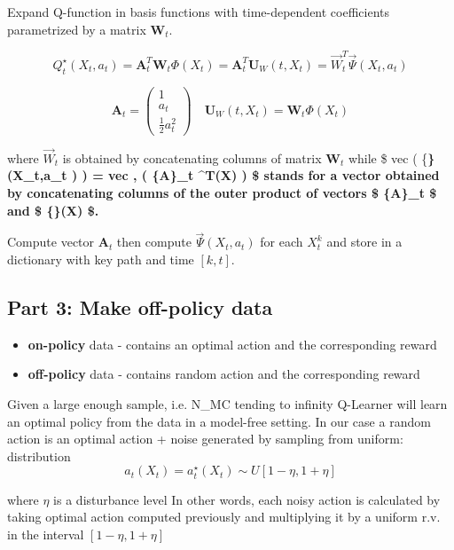 \documentclass[11pt]{article}
\providecommand{\tightlist}{%
      \setlength{\itemsep}{0pt}\setlength{\parskip}{0pt}}
\begin{document}
    Expand Q-function in basis functions with time-dependent coefficients
parametrized by a matrix \(\mathbf W_t\).

\[Q_t^\star\left(X_t,a_t\right)=\mathbf A_t^T\mathbf W_t\Phi\left(X_t\right)=\mathbf A_t^T\mathbf U_W\left(t,X_t\right)=\vec{W}_t^T \vec{\Psi}\left(X_t,a_t\right)\]

\[\mathbf A_t=\left(\begin{matrix}1\\a_t\\\frac{1}{2}a_t^2\end{matrix}\right)\quad\mathbf U_W\left(t,X_t\right)=\mathbf W_t\Phi\left(X_t\right)\]

where \(\vec{W}_t\) is obtained by concatenating columns of matrix
\(\mathbf W_t\) while \$ vec \left( \{\bf \Psi\} \left(X\_t,a\_t \right)
\right) = vec , \left( \{\bf A\}\_t \otimes {\bf \Phi}\^{}T(X) \right)
\$ stands for a vector obtained by concatenating columns of the outer
product of vectors \$ \{\bf A\}\_t \$ and \$ \{\bf \Phi\}(X) \$.

Compute vector \(\mathbf A_t\) then compute
\(\vec\Psi\left(X_t,a_t\right)\) for each \(X_t^k\) and store in a
dictionary with key path and time \(\left[k,t\right]\).

    \subsection{Part 3: Make off-policy
data}\label{part-3-make-off-policy-data}

\begin{itemize}
\tightlist
\item
  \textbf{on-policy} data - contains an optimal action and the
  corresponding reward
\item
  \textbf{off-policy} data - contains random action and the
  corresponding reward
\end{itemize}

Given a large enough sample, i.e. N\_MC tending to infinity Q-Learner
will learn an optimal policy from the data in a model-free setting. In
our case a random action is an optimal action + noise generated by
sampling from uniform: distribution
\[a_t\left(X_t\right) = a_t^\star\left(X_t\right) \sim U\left[1-\eta, 1 + \eta\right]\]

where \(\eta\) is a disturbance level In other words, each noisy action
is calculated by taking optimal action computed previously and
multiplying it by a uniform r.v. in the interval
\(\left[1-\eta, 1 + \eta\right]\)
\end{document}
